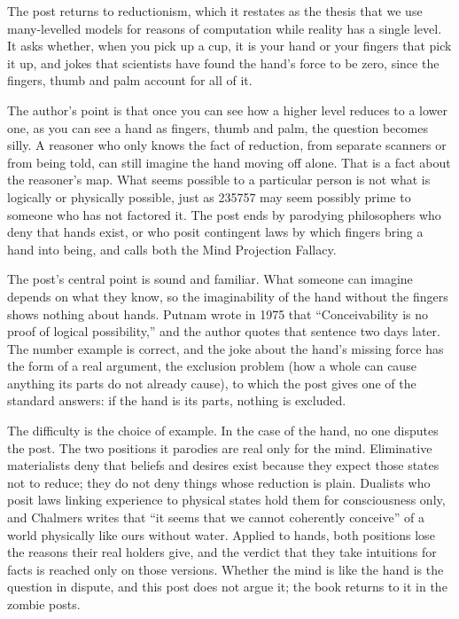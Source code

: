 \begin{afterword}
\summaryhead

The post returns to reductionism, which it restates as the thesis that we use many-levelled models for reasons of computation while reality has a single level. It asks whether, when you pick up a cup, it is your hand or your fingers that pick it up, and jokes that scientists have found the hand's force to be zero, since the fingers, thumb and palm account for all of it.

The author's point is that once you can see how a higher level reduces to a lower one, as you can see a hand as fingers, thumb and palm, the question becomes silly. A reasoner who only knows the fact of reduction, from separate scanners or from being told, can still imagine the hand moving off alone. That is a fact about the reasoner's map. What seems possible to a particular person is not what is logically or physically possible, just as 235757 may seem possibly prime to someone who has not factored it. The post ends by parodying philosophers who deny that hands exist, or who posit contingent laws by which fingers bring a hand into being, and calls both the Mind Projection Fallacy.

\responsehead

The post's central point is sound and familiar. What someone can imagine depends on what they know, so the imaginability of the hand without the fingers shows nothing about hands. Putnam wrote in 1975 that ``Conceivability is no proof of logical possibility,'' and the author quotes that sentence two days later. The number example is correct, and the joke about the hand's missing force has the form of a real argument, the exclusion problem (how a whole can cause anything its parts do not already cause), to which the post gives one of the standard answers: if the hand is its parts, nothing is excluded.

The difficulty is the choice of example. In the case of the hand, no one disputes the post. The two positions it parodies are real only for the mind. Eliminative materialists deny that beliefs and desires exist because they expect those states not to reduce; they do not deny things whose reduction is plain. Dualists who posit laws linking experience to physical states hold them for consciousness only, and Chalmers writes that ``it seems that we cannot coherently conceive'' of a world physically like ours without water. Applied to hands, both positions lose the reasons their real holders give, and the verdict that they take intuitions for facts is reached only on those versions. Whether the mind is like the hand is the question in dispute, and this post does not argue it; the book returns to it in the zombie posts.


\end{afterword}
